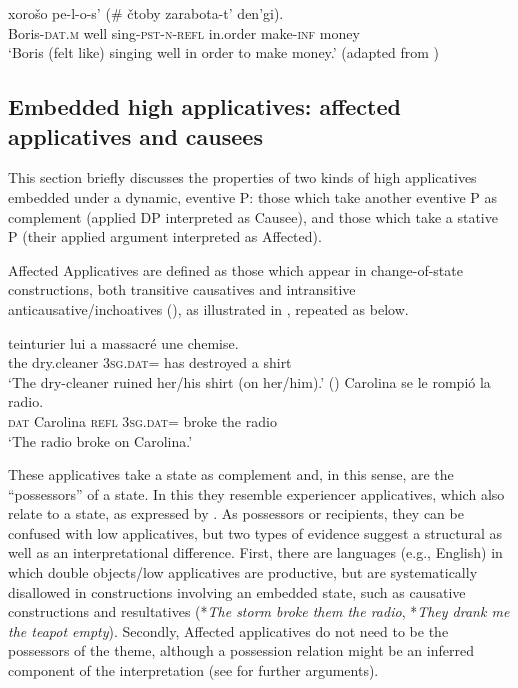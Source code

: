 \documentclass[output=paper,colorlinks,citecolor=brown,modfonts,nonflat]{langsci/langscibook}
\begin{document}
\ea%
    \label{ex:cuervo:11}
     {xorošo} {pe-l-o-s’} {(\# {čtoby}} {zarabota-t’} {den'gi).}\\
    Boris-\textsc{dat.m}   well sing-\textsc{pst-n-refl} in.order make-\textsc{inf} money\\
    \glt ‘Boris (felt like) singing well in order to make money.’   (adapted from \citealt[189]{Skorniakova2009})
    \z

\subsection{Embedded high applicatives: affected applicatives and causees}\label{sec:cuervo:4.3}

This section briefly discusses the properties of two kinds of high applicatives embedded under a dynamic, eventive {\liv}P: those which take another eventive {\liv}P as complement (applied DP interpreted as Causee), and those which take a stative {\liv}P (their applied argument interpreted as Affected).

Affected Applicatives are defined as those which appear in change-of-state constructions, both transitive causatives and intransitive anticausative/inchoatives (\citealt{Cuervo2003,Cuervo2010Probus,Cuervo2015Syntax}), as illustrated in , repeated as  below.

\ea%
    \label{ex:cuervo:12}
    \ea%
        \label{ex:cuervo:12a}
         {teinturier} {lui} {a} {massacré} {une} {chemise.}\\
        the dry.cleaner 3\textsc{sg.dat}= has destroyed a shirt\\
        \glt ‘The dry-cleaner ruined her/his shirt (on her/him).’  (\citealt{BonehNash2012})
    \ex%
        \label{ex:cuervo:12b}
         {Carolina} {se} {le} {rompió} {la} {radio}.\\
        \textsc{dat} Carolina  \textsc{refl} 3\textsc{sg.dat}=   broke the radio\\
        \glt ‘The radio broke on Carolina.’
    \z
\z

These applicatives take a state as complement and, in this sense, are the “possessors” of a state. In this they resemble experiencer applicatives, which also relate to a state, as expressed by .  As possessors or recipients, they can be confused with low applicatives, but two types of evidence suggest a structural as well as an interpretational difference. First, there are languages (e.g., English) in which double objects/low applicatives are productive, but are systematically disallowed in constructions involving an embedded state, such as causative constructions and resultatives (*\textit{The storm broke them the radio}, *\textit{They drank me the teapot empty}). Secondly, Affected applicatives do not need to be the possessors of the theme, although a possession relation might be an inferred component of the interpretation (see \citealt{Cuervo2003} for further arguments).
\end{document}

